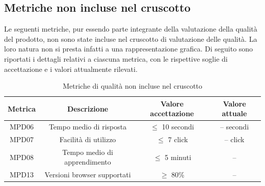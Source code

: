 \documentclass[10pt]{article}
\begin{document}
\begin{justify}
\section{Metriche non incluse nel cruscotto}
Le seguenti metriche, pur essendo parte integrante della valutazione della qualità del prodotto, non sono state incluse nel cruscotto di valutazione delle qualità. La loro natura non si presta infatti a una rappresentazione grafica.
Di seguito sono riportati i dettagli relativi a ciascuna metrica, con le rispettive soglie di accettazione e i valori attualmente rilevati.

\begin{table}[H]
  \centering
\begin{tabular}{|c|c|c|c|}
    \hline
    \textbf{Metrica} & \textbf{Descrizione} & \textbf{Valore accettazione} & \textbf{Valore attuale}\\
    \hline
    MPD06 & Tempo medio di risposta & $\leq$ 10 secondi & -- secondi\\
    \hline
    MPD07 & Facilità di utilizzo & $\leq$ 7 click & -- click\\
    \hline
    MPD08 & Tempo medio di apprendimento & $\leq$ 5 minuti & -- \\
    \hline
    MPD13 & Versioni browser supportati & $\geq$ 80\% & -- \\
    \hline
    \end{tabular}
    \caption{Metriche di qualità non incluse nel cruscotto}
\end{table}

\end{justify}
\end{document}
